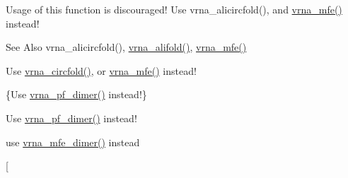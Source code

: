 \begin{DoxyRefList}
\item[\label{deprecated__deprecated000013}%
\hypertarget{deprecated__deprecated000013}{}%
Global \hyperlink{group__consensus__mfe__fold_gadbd3b0b1c144cbfb4efe704b2b260f96}{circalifold} (const char $\ast$$\ast$strings, char $\ast$structure)]Usage of this function is discouraged! Use vrna\-\_\-alicircfold(), and \hyperlink{group__mfe__fold_gabd3b147371ccf25c577f88bbbaf159fd}{vrna\-\_\-mfe()} instead! \begin{DoxySeeAlso}{See Also}
vrna\-\_\-alicircfold(), \hyperlink{group__consensus__mfe__fold_ga02098d0c8790f9a37fbef6ad0cfc705c}{vrna\-\_\-alifold()}, \hyperlink{group__mfe__fold_gabd3b147371ccf25c577f88bbbaf159fd}{vrna\-\_\-mfe()} 
\end{DoxySeeAlso}

\item[\label{deprecated__deprecated000065}%
\hypertarget{deprecated__deprecated000065}{}%
Global \hyperlink{group__mfe__fold__single_ga4ac63ab3e8d9a80ced28b8052d94e423}{circfold} (const char $\ast$sequence, char $\ast$structure)]Use \hyperlink{group__mfe__fold__single_gaa0f5bf321038f404b36a6147bdae4154}{vrna\-\_\-circfold()}, or \hyperlink{group__mfe__fold_gabd3b147371ccf25c577f88bbbaf159fd}{vrna\-\_\-mfe()} instead! 
\item[\label{deprecated__deprecated000109}%
\hypertarget{deprecated__deprecated000109}{}%
Global \hyperlink{part__func__co_8h_ae5c1e7331718669bdae7a86de2be6184}{co\-\_\-pf\-\_\-fold} (char $\ast$sequence, char $\ast$structure)]\{Use \hyperlink{group__pf__cofold_ga4e5c7d06c302a7c59fc0d64dc142ca63}{vrna\-\_\-pf\-\_\-dimer()} instead!\} 
\item[\label{deprecated__deprecated000110}%
\hypertarget{deprecated__deprecated000110}{}%
Global \hyperlink{part__func__co_8h_aabfc6cb6d02b8f08ac4c92f4f5b125d9}{co\-\_\-pf\-\_\-fold\-\_\-par} (char $\ast$sequence, char $\ast$structure, vrna\-\_\-exp\-\_\-param\-\_\-t $\ast$parameters, int calculate\-\_\-bppm, int is\-\_\-constrained)]Use \hyperlink{group__pf__cofold_ga4e5c7d06c302a7c59fc0d64dc142ca63}{vrna\-\_\-pf\-\_\-dimer()} instead! 
\item[\label{deprecated__deprecated000030}%
\hypertarget{deprecated__deprecated000030}{}%
Global \hyperlink{group__mfe__cofold_gabc8517f22cfe70595ee81fc837910d52}{cofold} (const char $\ast$sequence, char $\ast$structure)]use \hyperlink{group__mfe__cofold_gaab22d10c1190f205f16a77cab9d5d3ee}{vrna\-\_\-mfe\-\_\-dimer()} instead 
\item[\label{deprecated__deprecated000031}%
\hypertarget{deprecated__deprecated000031}{}%

\end{DoxyRefList}
